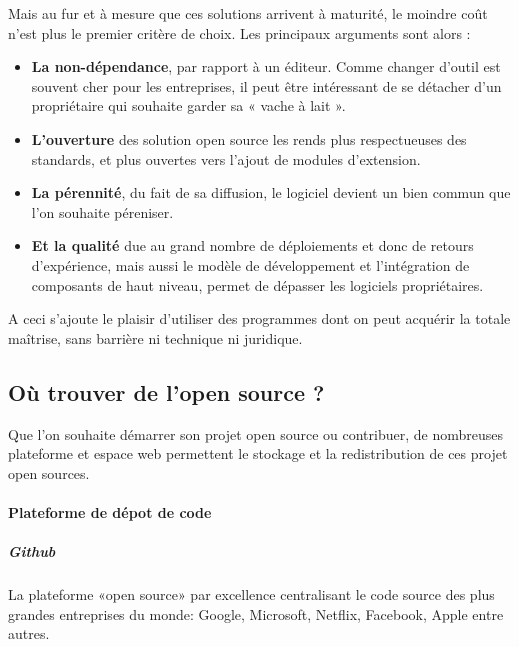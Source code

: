 			Mais au fur et à mesure que ces solutions arrivent à maturité, le moindre coût n'est plus le premier critère de choix.
			Les principaux arguments sont alors :

			\begin{itemize}[label=\textbullet, font=\LARGE \color{burntorange}]
				\item \textbf{La non-dépendance}, par rapport à un éditeur. Comme changer d'outil est souvent cher pour les entreprises, il peut être intéressant de se détacher d'un propriétaire qui souhaite garder sa « vache à lait ».
				\item \textbf{L'ouverture} des solution open source les rends plus respectueuses des standards, et plus ouvertes vers l'ajout de modules d'extension.
				\item \textbf{La pérennité}, du fait de sa diffusion, le logiciel devient un bien commun que l'on souhaite péreniser. 
				\item \textbf{Et la qualité} due au grand nombre de déploiements et donc de retours d'expérience, mais aussi le modèle de développement et l'intégration de composants de haut niveau, permet de dépasser les logiciels propriétaires.
			\end{itemize}

			A ceci s'ajoute le plaisir d'utiliser des programmes dont on peut acquérir la totale maîtrise, sans barrière ni technique ni juridique.

		\subsection{Où trouver de l'open source ?} 

			Que l'on souhaite démarrer son projet open source ou contribuer, de nombreuses plateforme et espace web permettent le stockage et la redistribution de ces projet open sources.

			\paragraph{Plateforme de dépot de code}

				\subparagraph{Github\\}
				La plateforme «open source» par excellence centralisant le code source des plus grandes entreprises du monde: Google, Microsoft, Netflix, Facebook, Apple entre autres.

